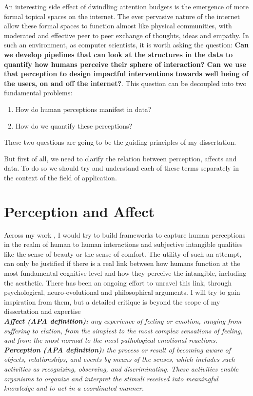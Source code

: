 An interesting side effect of dwindling attention budgets is the emergence of more formal topical spaces on the internet. The ever pervasive nature of the internet allow these formal spaces to function almost like physical communities, with moderated and effective peer to peer exchange of thoughts, ideas and empathy\cite{kummervold2002social,squire2015should,hwang2010social}.
In such an environment, as computer scientists, it is worth asking the question: \textbf{Can we develop pipelines that can look at the structures in the data to quantify how humans perceive their sphere of interaction? Can we use that perception to design impactful interventions towards well being of the users, on and off the internet?}. 
This question can be decoupled into two fundamental problems:
\begin{enumerate}
\item How do human perceptions manifest in data? 
\item How do we quantify these perceptions?
\end{enumerate}
These two questions are going to be the guiding principles of my dissertation. 

But first of all, we need to clarify the relation between perception, affects and data. To do so we should try and understand each of these terms separately in the context of the field of application.

\section{Perception and Affect}
Across my work , I would try to build frameworks to capture human perceptions in the realm of human to human interactions and subjective intangible qualities like the sense of beauty or the sense of comfort. The utility of such an attempt, can only be justified if there is a real link between how humans function at the most fundamental cognitive level and how they perceive the intangible, including the aesthetic. There has been an ongoing effort to unravel this link, through psychological, neuro-evolutional and philosophical arguments. I will try to gain inspiration from them, but a detailed critique is beyond the scope of my dissertation and expertise\\
\textsl{\textbf{Affect (APA definition):} any experience of feeling or emotion, ranging from suffering to elation, from the simplest to the most complex sensations of feeling, and from the most normal to the most pathological emotional reactions.}\\
\textsl{\textbf{Perception (APA definition):} the process or result of becoming aware of objects, relationships, and events by means of the senses, which includes such activities as recognizing, observing, and discriminating. These activities enable organisms to organize and interpret the stimuli received into meaningful knowledge and to act in a coordinated manner.}\\

